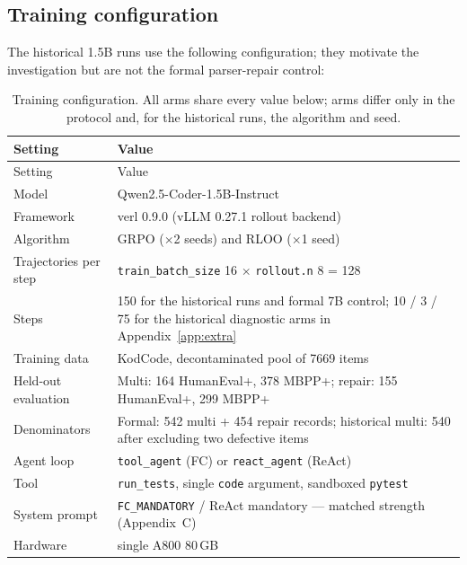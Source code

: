 \subsection{Training configuration}

The historical 1.5B runs use the following configuration; they motivate the investigation but are
not the formal parser-repair control:

{\small
\begin{longtable}[]{@{}p{.27\linewidth}p{}@{}}
\caption{Training configuration. All arms share every value below; arms differ only in the
protocol and, for the historical runs, the algorithm and seed.}\label{tab:trainconfig}\\
\toprule
Setting & Value \\
\midrule
\endfirsthead
\toprule
Setting & Value \\
\midrule
\endhead
Model & Qwen2.5-Coder-1.5B-Instruct \\
Framework & verl 0.9.0 (vLLM 0.27.1 rollout backend) \\
Algorithm & GRPO ($\times$2 seeds) and RLOO ($\times$1 seed) \\
Trajectories per step & \texttt{train\_batch\_size} 16 $\times$ \texttt{rollout.n} 8 = 128 \\
Steps & 150 for the historical runs and formal 7B control; 10 / 3 / 75 for the historical
diagnostic arms in Appendix~\ref{app:extra} \\
Training data & KodCode, decontaminated pool of 7669 items \\
Held-out evaluation & Multi: 164 HumanEval+, 378 MBPP+; repair: 155 HumanEval+, 299 MBPP+ \\
Denominators & Formal: 542 multi + 454 repair records; historical multi: 540 after excluding two defective items \\
Agent loop & \texttt{tool\_agent} (FC) or \texttt{react\_agent} (ReAct) \\
Tool & \texttt{run\_tests}, single \texttt{code} argument, sandboxed \texttt{pytest} \\
System prompt & \texttt{FC\_MANDATORY} / ReAct mandatory --- matched strength (Appendix~C) \\
Hardware & single A800 80\,GB \\
\bottomrule
\end{longtable}
}

